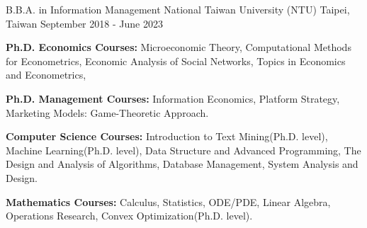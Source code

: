 

\begin{cventries}

  \cventry
  {B.B.A. in Information Management} %
    {National Taiwan University (NTU)} %
    {Taipei, Taiwan} %
    {September 2018 - June 2023} %
    {
      \begin{cvitems} %
        \item   \textbf{Ph.D. Economics Courses:}
                Microeconomic Theory,
                Computational Methods for Econometrics,
                Economic Analysis of Social Networks,
                Topics in Economics and Econometrics,
        \item   \textbf{Ph.D. Management Courses:}
                Information Economics, Platform Strategy,
                Marketing Models: Game-Theoretic Approach.
        \item   \textbf{Computer Science Courses:}
            Introduction to Text Mining(Ph.D. level),
            Machine Learning(Ph.D. level),
                Data Structure and Advanced Programming,
                The Design and Analysis of Algorithms,
                Database Management,
                System Analysis and Design.
        \item   \textbf{Mathematics Courses:}
                Calculus,
                Statistics,
                ODE/PDE,
                Linear Algebra,
                Operations Research,
                Convex Optimization(Ph.D. level).
      \end{cvitems}
    }

\end{cventries}
